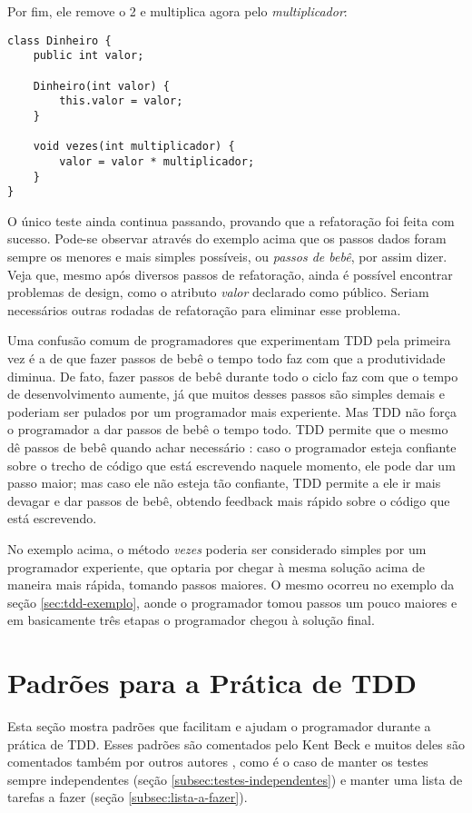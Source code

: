 Por fim, ele remove o 2 e multiplica agora pelo \textit{multiplicador}:

\begin{lstlisting}[frame=trbl]
class Dinheiro {
	public int valor;
	
	Dinheiro(int valor) {
		this.valor = valor;
	}
	
	void vezes(int multiplicador) {
		valor = valor * multiplicador;
	}
}
\end{lstlisting}

O único teste ainda continua passando, provando que a refatoração foi feita com sucesso. Pode-se observar através
do exemplo acima que os passos dados foram sempre os menores e mais simples possíveis, ou \textit{passos de bebê}, por assim dizer. 
Veja que, mesmo após diversos passos de refatoração, ainda é possível encontrar problemas de design, como o atributo \textit{valor}
declarado como público. Seriam necessários outras rodadas de refatoração para eliminar esse problema.

Uma confusão comum de programadores que experimentam TDD pela primeira vez é a de que fazer passos de bebê o tempo todo faz
com que a produtividade diminua. De fato, fazer passos de bebê durante todo o ciclo faz com que o tempo de desenvolvimento aumente,
já que muitos desses passos são simples demais e poderiam ser pulados por um programador mais experiente. Mas TDD não força o programador
a dar passos de bebê o tempo todo. TDD permite que o mesmo dê passos de bebê quando achar necessário \cite{TDDByExample}: caso
o programador esteja confiante sobre o trecho de código que está escrevendo naquele momento, ele pode dar um passo maior; mas caso ele
não esteja tão confiante, TDD permite a ele ir mais devagar e dar passos de bebê, obtendo feedback mais rápido sobre o código que está escrevendo. 

No exemplo acima, o método \textit{vezes} poderia ser considerado simples por um programador experiente, que optaria por chegar à
mesma solução acima de maneira mais rápida, tomando passos maiores. O mesmo ocorreu no exemplo da seção \ref{sec:tdd-exemplo}, aonde o
programador tomou passos um pouco maiores e em basicamente três etapas o programador chegou à solução final.

\section{Padrões para a Prática de TDD}
\label{sec:tdd-patterns}

Esta seção mostra padrões que facilitam e ajudam o programador durante a prática de TDD. Esses padrões são
comentados pelo Kent Beck \cite{TDDByExample} e muitos deles são comentados também por outros autores \cite{GOOS},
como é o caso de manter os testes sempre independentes (seção \ref{subsec:testes-independentes}) e manter
uma lista de tarefas a fazer (seção \ref{subsec:lista-a-fazer}).

